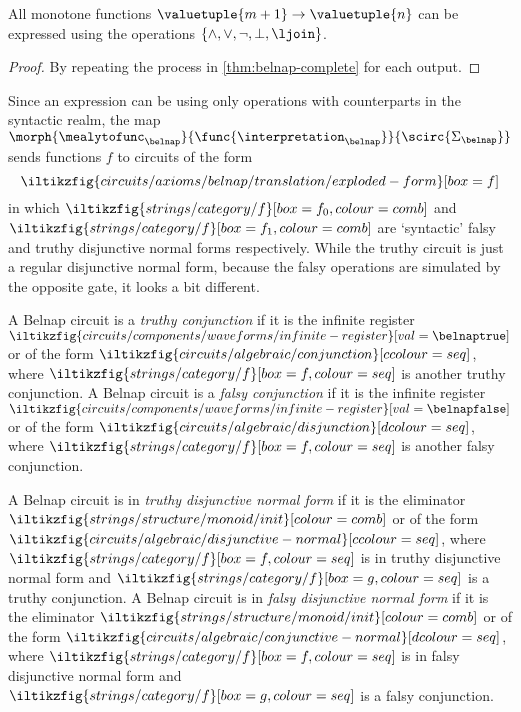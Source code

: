 \begin{corollary}
    All monotone functions \(\valuetuple{m+1} \to \valuetuple{n}\) can be
    expressed using the operations \(\{\land,\lor,\neg,\bot,\ljoin\}\).
\end{corollary}
\begin{proof}
    By repeating the process in \cref{thm:belnap-complete} for each output.
\end{proof}

Since an expression can be  using only operations with counterparts in
the syntactic realm, the map \(
\morph{\mealytofunc_\belnap}{\func{\interpretation_\belnap}}{\scirc{\Sigma_\belnap}}
\) sends functions \(f\) to circuits of the form \[
    \iltikzfig{circuits/axioms/belnap/translation/exploded-form}[box=f]
\] in which \(
\iltikzfig{strings/category/f}[box=f_0,colour=comb]
\) and \(
\iltikzfig{strings/category/f}[box=f_1,colour=comb]
\) are `syntactic' falsy and truthy disjunctive normal forms respectively.
While the truthy circuit is just a regular disjunctive normal form, because
the falsy operations are simulated by the opposite gate, it looks a bit
different.

\begin{definition}[Conjunction]
    A Belnap circuit is a \emph{truthy conjunction} if it is the infinite
    register \(
    \iltikzfig{circuits/components/waveforms/infinite-register}[val=\belnaptrue]
    \) or of the form \(
    \iltikzfig{circuits/algebraic/conjunction}[ccolour=seq]
    \), where \(
    \iltikzfig{strings/category/f}[box=f, colour=seq]
    \) is another truthy conjunction.
    A Belnap circuit is a \emph{falsy conjunction} if it is the infinite
    register \(
    \iltikzfig{circuits/components/waveforms/infinite-register}[val=\belnapfalse]
    \) or of the form \(
    \iltikzfig{circuits/algebraic/disjunction}[dcolour=seq]
    \), where \(
    \iltikzfig{strings/category/f}[box=f, colour=seq]
    \) is another falsy conjunction.
\end{definition}

\begin{definition}
    A Belnap circuit is in \emph{truthy disjunctive normal form} if it is the
    eliminator \(
    \iltikzfig{strings/structure/monoid/init}[colour=comb]
    \) or of the form \(
    \iltikzfig{circuits/algebraic/disjunctive-normal}[ccolour=seq]
    \), where \(
    \iltikzfig{strings/category/f}[box=f, colour=seq]
    \) is in truthy disjunctive normal form and \(
    \iltikzfig{strings/category/f}[box=g, colour=seq]
    \) is a truthy conjunction.
    A Belnap circuit is in \emph{falsy disjunctive normal form} if it is the
    eliminator \(
    \iltikzfig{strings/structure/monoid/init}[colour=comb]
    \) or of the form \(
    \iltikzfig{circuits/algebraic/conjunctive-normal}[dcolour=seq]
    \), where \(
    \iltikzfig{strings/category/f}[box=f, colour=seq]
    \) is in falsy disjunctive normal form and \(
    \iltikzfig{strings/category/f}[box=g, colour=seq]
    \) is a falsy conjunction.
\end{definition}

